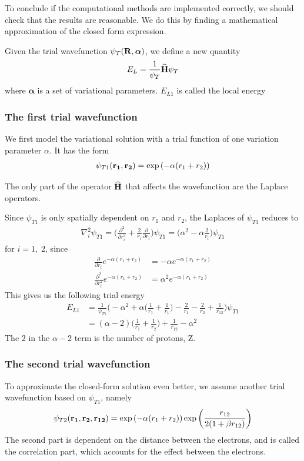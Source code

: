 \documentclass[twocolumn]{article}[10pt]
\newcommand{\eq}[1]{\begin{align*}#1\end{align*}}
\renewcommand\vec[1]{{\bf #1}}
\newcommand{\OP}[1]{{\bf\widehat{#1}}}
\begin{document}
To conclude if the computational methods are implemented correctly,
we should check that the results are reasonable. We do this by
finding a mathematical approximation of the closed form expression.

Given the trial wavefunction $\psi_T (\vec R, \boldsymbol\alpha)$, 
we define a new quantity
{\small
\eq{
  E_L = \frac{1}{\psi_T}\OP H \psi_T
}}%
where $\boldsymbol\alpha$ is a set of variational parameters.
$E_{L1}$ is called the local energy

\subsubsection{The first trial wavefunction}
We first model the variational solution with a trial function of one
variation parameter $\alpha$. It has the form
{\small
\eq{
\psi_{T1}({\bf r_1},{\bf r_2}) = 
   \exp{\left(-\alpha(r_1+r_2)\right)}
}}%

The only part of the operator $\OP H$ that affects the wavefunction
are the Laplace operators.

Since $\psi_{T1}$ is only spatially dependent on $r_1$ and $r_2$,
the Laplaces of $\psi_{T1}$ reduces to
{\small
\eq{
  \nabla_i^2 \psi_{T1} = \bigg( \frac{\partial^2}{\partial r_i^2} 
    + \frac{2}{r_i} \frac{\partial}{\partial r_i} \bigg) \psi_{T1}
    = \bigg( \alpha^2 -\alpha\frac{2}{r_i}  \bigg)\psi_{T1}
}}%
for $i = 1,\;2$, since
{\small
\eq{
  \frac{\partial}{\partial r_i} e^{-\alpha (r_1+r_2)}
    &= -\alpha e^{-\alpha (r_1+r_2)}\\
\frac{\partial^2}{\partial r_i^2} e^{-\alpha (r_1+r_2)}
    &= \alpha^2 e^{-\alpha (r_1+r_2)}
}}%
This gives us the following trial energy
{\small
\eq{
  E_{L1}&=\frac{1}{\psi_{T1}}\bigg( -\alpha^2 
  +\alpha\bigg( \frac{1}{r_1}+\frac{1}{r_1}  \bigg)
    -\frac{2}{r_1}-\frac{2}{r_2} + \frac{1}{r_{12}}
    \bigg)\psi_{T1}\\
  &=(\alpha-2)\bigg( \frac{1}{r_1}+\frac{1}{r_2} \bigg)
    +\frac{1}{r_{12}}-\alpha^2
}}%
The $2$ in the $\alpha-2$ term is the number of protons, Z.

\subsubsection{The second trial wavefunction}
To approximate the closed-form solution even better,
we assume another trial wavefunction based on $\psi_{T1}$, namely
{\small
\eq{
  \psi_{T2} ({\bf r_1},{\bf r_2}, {\bf r_{12}})
    =\exp{\left(-\alpha(r_1+r_2)\right)}
    \exp{\left(\frac{r_{12}}{2(1+\beta r_{12})}\right)}
}}%
The second part is dependent on the distance between the
electrons, and is called the correlation part,
which accounts for the effect between the electrons.
\end{document}
